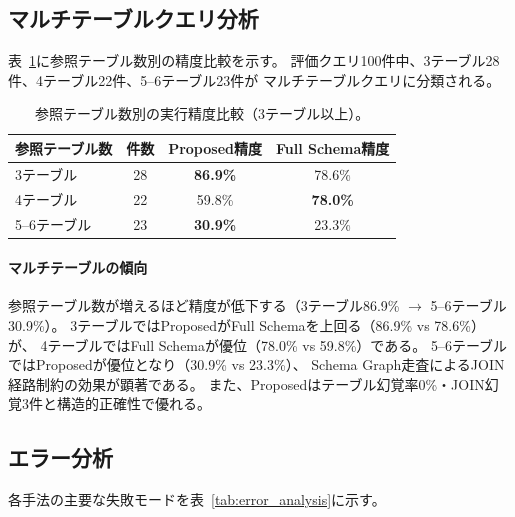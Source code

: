 \documentclass[5p,twocolumn]{elsarticle}
\begin{document}
\subsection{マルチテーブルクエリ分析}
\label{sec:multihop}

表~\ref{tab:multihop}に参照テーブル数別の精度比較を示す。
評価クエリ100件中、3テーブル28件、4テーブル22件、5--6テーブル23件が
マルチテーブルクエリに分類される。

\begin{table}[htbp]
  \centering
  \caption{参照テーブル数別の実行精度比較（3テーブル以上）。}
  \label{tab:multihop}
  \small
  \begin{tabular}{lccc}
    \toprule
    参照テーブル数 & 件数 & Proposed精度 & Full Schema精度 \\
    \midrule
    3テーブル & 28 & \textbf{86.9\%} & 78.6\% \\
    4テーブル & 22 & 59.8\% & \textbf{78.0\%} \\
    5--6テーブル & 23 & \textbf{30.9\%} & 23.3\% \\
    \bottomrule
  \end{tabular}
\end{table}

\paragraph{マルチテーブルの傾向}

参照テーブル数が増えるほど精度が低下する（3テーブル86.9\% $\to$ 5--6テーブル30.9\%）。
3テーブルではProposedがFull Schemaを上回る（86.9\% vs 78.6\%）が、
4テーブルではFull Schemaが優位（78.0\% vs 59.8\%）である。
5--6テーブルではProposedが優位となり（30.9\% vs 23.3\%）、
Schema Graph走査によるJOIN経路制約の効果が顕著である。
また、Proposedはテーブル幻覚率0\%・JOIN幻覚3件と構造的正確性で優れる。
\subsection{エラー分析}
\label{sec:error_analysis}

各手法の主要な失敗モードを表~\ref{tab:error_analysis}に示す。
\end{document}
